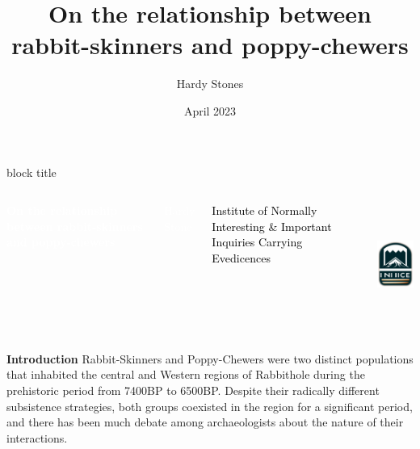 \documentclass[final]{beamer}
\title{On the relationship between rabbit-skinners and poppy-chewers}
\author{Hardy Stones}
\institute{Human Language Technology and Pattern Recognition,RWTH Aachen University}
\date{April 2023}
\begin{document}
\begin{frame}[t]
    \vspace{-.5cm}
    \begin{beamercolorbox}[wd=\paperwidth]{block title}
    \vspace{.8cm}
        \begin{columns}


            {
                \raggedleft
                \textcolor{white}{\textbf{On the relationship between rabbit-skinners and poppy-chewers}}\par
                \textcolor{white}{Hardy Stone}\par
                \textcolor{black}{Institute of Normally Interesting \& Important Inquiries Carrying Evedicences}\par
            }

            \includegraphics[height=4cm]{uni2.png}
        \end{columns}
    \vspace{.8cm}

    \end{beamercolorbox}


    \vspace{2cm}


    \begin{columns}[t]

        \begin{block}{\textbf{Introduction}}
            Rabbit-Skinners and Poppy-Chewers were two distinct populations that inhabited the central and Western regions of Rabbithole during the prehistoric period from 7400BP to 6500BP. Despite their radically different subsistence strategies, both groups coexisted in the region for a significant period, and there has been much debate among archaeologists about the nature of their interactions.
        \end{block}
        \vspace{3cm}


\end{columns}
\end{frame}
\end{document}
